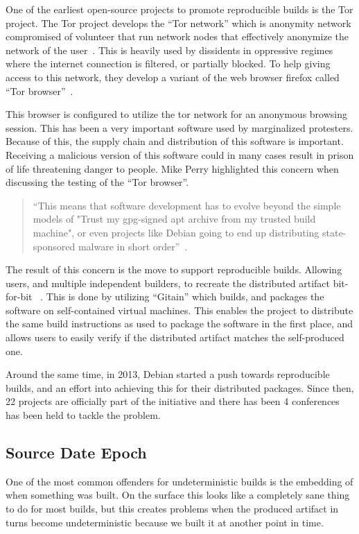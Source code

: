 \documentclass[../Main/thesis.tex]{subfiles}
\begin{document}
One of the earliest open-source projects to promote reproducible builds is the
Tor project. The Tor project develops the ``Tor network'' which is anonymity
network compromised of volunteer that run network nodes that effectively
anonymize the network of the user~\cite{tor}. This is heavily used by dissidents
in oppressive regimes where the internet connection is filtered, or partially
blocked. To help giving access to this network, they develop a variant of the
web browser firefox called ``Tor browser''~\cite{tor-browser}.


This browser is configured to utilize the tor network for an anonymous browsing
session. This has been a very important software used by marginalized
protesters. Because of this, the supply chain and distribution of this software
is important. Receiving a malicious version of this software could in many cases
result in prison of life threatening danger to people. Mike Perry highlighted
this concern when discussing the testing of the ``Tor browser''.

\begin{quotation}
``This means that software development has to evolve beyond the simple models of
"Trust my gpg-signed apt archive from my trusted build machine", or even
projects like Debian going to end up distributing state-sponsored malware in
short order''~\cite{mike-perry-2013}.
\end{quotation}


The result of this concern is the move to support reproducible builds. Allowing
users, and multiple independent builders, to recreate the distributed artifact
bit-for-bit ~\cite{unknown-2014}. This is done by utilizing ``Gitain'' which
builds, and packages the software on self-contained virtual machines. This
enables the project to distribute the same build instructions as used to package
the software in the first place, and allows users to easily verify if the
distributed artifact matches the self-produced one.


Around the same time, in 2013, Debian started a push towards reproducible
builds, and an effort into achieving this for their distributed packages. Since
then, 22 projects are officially part of the initiative and there has been 4
conferences has been held to tackle the problem.

\subsection*{Source Date Epoch}
One of the most common offenders for undeterministic builds is the embedding of
when something was built. On the surface this looks like a completely sane thing
to do for most builds, but this creates problems when the produced artifact in
turns become undeterministic because we built it at another point in time.
\end{document}
